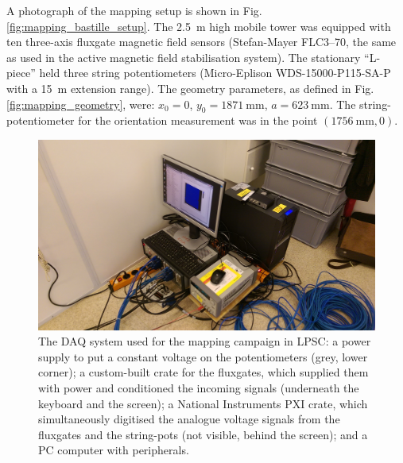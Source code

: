 A photograph of the mapping setup is shown in Fig.\,\ref{fig:mapping_bastille_setup}. The \SI{2.5}{\metre} high mobile tower was equipped with ten three-axis fluxgate magnetic field sensors (Stefan-Mayer FLC3--70, the same as used in the active magnetic field stabilisation system).
The stationary ``L-piece'' held three string potentiometers (Micro-Eplison WDS-15000-P115-SA-P with a \SI{15}{\metre} extension range).
The geometry parameters, as defined in Fig.\,\ref{fig:mapping_geometry}, were: $x_0 = 0$, $y_0 = \SI{1871}{\milli\metre}$, $a = \SI{623}{\milli\metre}$. The string-potentiometer for the orientation measurement was in the point $(\SI{1756}{\milli\metre}, 0)$.



\begin{figure}
  \centering
  \includegraphics[width=\linewidth]{gfx/mapping/lpsc/daq.jpeg}
  \caption{The DAQ system used for the mapping campaign in LPSC\@: a power supply to put a constant voltage on the potentiometers (grey, lower corner); a custom-built crate for the fluxgates, which supplied them with power and conditioned the incoming signals (underneath the keyboard and the screen); a National Instruments PXI crate, which simultaneously digitised the analogue voltage signals from the fluxgates and the string-pots (not visible, behind the screen); and a PC computer with peripherals.}\label{fig:mapping_bastille_daq}
\end{figure}


